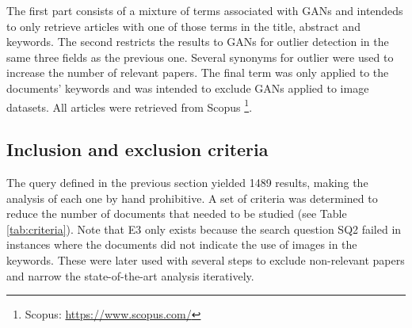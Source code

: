 The first part consists of a mixture of terms associated with GANs and intendeds to only retrieve articles with one of those terms in the title, abstract and keywords. The second restricts the results to GANs for outlier detection in the same three fields as the previous one. Several synonyms for outlier were used to increase the number of relevant papers. The final term was only applied to the documents' keywords and was intended to exclude GANs applied to image datasets. All articles were retrieved from Scopus \footnote{Scopus: \url{https://www.scopus.com/}}.


\subsection{Inclusion and exclusion criteria}\label{sec:gan_inclusion_exclusion}
The query defined in the previous section yielded 1489 results, making the analysis of each one by hand prohibitive. A set of criteria was determined to reduce the number of documents that needed to be studied (see Table \ref{tab:criteria}). Note that E3 only exists because the search question SQ2 failed in instances where the documents did not indicate the use of images in the keywords. These were later used with several steps to exclude non-relevant papers and narrow the state-of-the-art analysis iteratively. 

